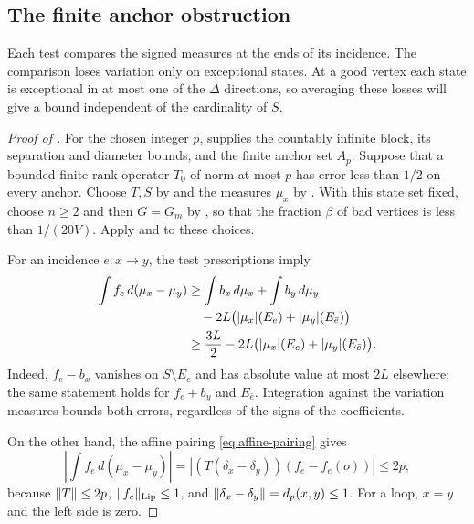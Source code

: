 \subsection{The finite anchor obstruction}

Each test compares the signed measures at the ends of its incidence.
The comparison loses variation only on exceptional states. At a good
vertex each state is exceptional in at most one of the $\Delta$
directions, so averaging these losses will give a bound independent
of the cardinality of $S$.

\begin{proof}[Proof of ]
For the chosen integer $p$,  supplies the
countably infinite block, its separation and diameter bounds, and the
finite anchor set $A_p$. Suppose that a bounded finite-rank operator
$T_0$ of norm at most $p$ has error less than $1/2$ on every anchor.
Choose $T,S$ by  and the measures $\mu_x$
by . With this state set fixed, choose
$n\ge2$ and then $G=G_m$ by , so that the
fraction $\beta$ of bad vertices is less than $1/(20V)$. Apply
 and  to these choices.

For an incidence $e:x\to y$, the test prescriptions imply
\begin{align}
 \int f_e\,d(\mu_x-\mu_y)
 &\ge\int b_x\,d\mu_x+\int b_y\,d\mu_y\notag\\
 &\quad-2L\bigl(|\mu_x|(E_e)+|\mu_y|(E_{\bar e})\bigr)\notag\\
 &\ge\frac{3L}{2}
       -2L\bigl(|\mu_x|(E_e)+|\mu_y|(E_{\bar e})\bigr).
       \label{eq:edge-lower}
\end{align}
Indeed, $f_e-b_x$ vanishes on $S\setminus E_e$ and has absolute value
at most $2L$ elsewhere; the same statement holds for $f_e+b_y$ and
$E_{\bar e}$. Integration against the variation measures bounds both
errors, regardless of the signs of the coefficients.

On the other hand, the affine pairing \eqref{eq:affine-pairing} gives
\begin{equation}\label{eq:edge-upper}
 \left|\int f_e\,d(\mu_x-\mu_y)\right|
 =\left|(T(\delta_x-\delta_y))(f_e-f_e(o))\right|
 \le2p,
\end{equation}
because $\left\|T\right\|\le2p$, $\|f_e\|_{\mathrm{Lip}}\le1$, and
$\left\|\delta_x-\delta_y\right\|=d_p(x,y)\le1$. For a loop, $x=y$ and
the left side is zero.


\end{proof}
